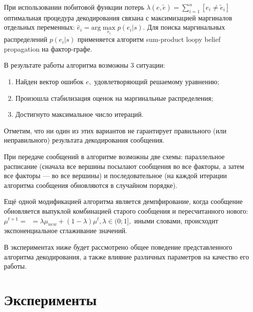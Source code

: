 \documentclass[12pt,a4paper,oneside,fleqn,leqno]{article}
\begin{document}
		При использовании побитовой функции потерь $\lambda(e, \tilde e) = \sum\limits_{i = 1}^n[e_i \neq \tilde e_i]$ оптимальная процедура декодирования связана с максимизацией маргиналов отдельных переменных: $\hat{e}_i = \text{arg} \max\limits_{e_i}p(e_i|s).$
Для поиска маргинальных распределений $p(e_i|s)$ применяется алгоритм sum-product loopy belief propagation на фактор-графе.\par
		В результате работы алгоритма возможны 3 ситуации:
		\begin{enumerate}
			\itemsep0em
			\item
			Найден вектор ошибок $e,$ удовлетворяющий решаемому уравнению;
			\item
			Произошла стабилизация оценок на маргинальные распределения;
			\item
			Достигнуто максимальное число итераций.
		\end{enumerate}\par
		Отметим, что ни один из этих вариантов не гарантирует правильного (или неправильного) результата декодирования сообщения.\par
		При передаче сообщений в алгоритме возможны две схемы: параллельное расписание (сначала все вершины посылают сообщения во все факторы, а затем все факторы --- во все вершины) и последовательное (на каждой итерации алгоритма сообщения обновляются в случайном порядке).\par
		Ещё одной модификацией алгоритма является демпфирование, когда сообщение обновляется выпуклой комбинацией старого сообщения и пересчитанного нового: $\mu^{t + 1} =\,\,\,= \lambda \mu_{new} + (1 - \lambda)\mu^{t}, \lambda \in (0;1],$ иными словами, происходит экспоненциальное сглаживание значений.
		\par
		В экспериментах ниже будет рассмотрено общее поведение представленного алгоритма декодирования, а также влияние различных параметров на качество его работы.
	\section{Эксперименты}
\end{document}

